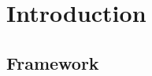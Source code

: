 \section{Introduction} \label{sec:Introduction}
\subsection{Framework} \label{sec:Introduction_Framework}
